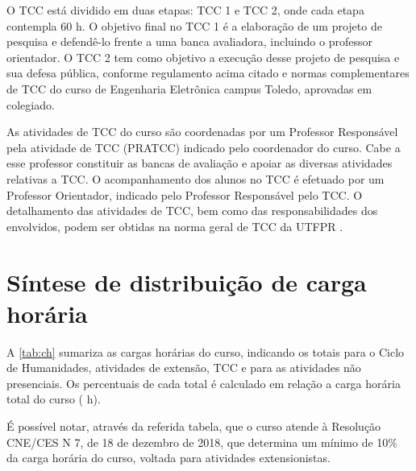 O TCC está dividido em duas etapas: TCC 1 e TCC 2, onde cada etapa contempla 60 h. O objetivo final no TCC 1 é a elaboração de um projeto de pesquisa e defendê-lo frente a uma banca avaliadora, incluindo o professor orientador. O TCC 2 tem como objetivo a execução desse projeto de pesquisa e sua defesa pública, conforme regulamento acima citado e normas complementares de TCC do curso de Engenharia Eletrônica campus Toledo, aprovadas em colegiado.

As atividades de TCC do curso são coordenadas por um Professor Responsável pela atividade de TCC (PRATCC) indicado pelo coordenador do curso. Cabe a esse professor constituir as bancas de avaliação e apoiar as diversas atividades relativas a TCC. O acompanhamento dos alunos no TCC é efetuado por um Professor Orientador, indicado pelo Professor Responsável pelo TCC. O detalhamento das atividades de TCC, bem como das responsabilidades dos envolvidos, podem ser obtidas na norma geral de TCC da UTFPR \cite{cogep18}.

\section{Síntese de distribuição de carga horária}

A \autoref{tab:ch} sumariza as cargas horárias do curso, indicando os totais para o Ciclo de Humanidades, atividades de extensão, TCC e para as atividades não presenciais. Os percentuais de cada total é calculado em relação a carga horária total do curso (\the\value{horasT} h).

É possível notar, através da referida tabela, que o curso atende à Resolução CNE/CES N\textordmasculine{} 7, de 18 de dezembro de 2018, que determina um mínimo de 10$\%$ da carga horária do curso, voltada para atividades extensionistas.

